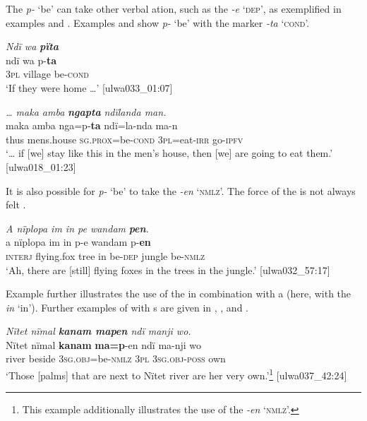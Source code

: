 The  \textit{p-} ‘be’ can take other verbal ation, such as the  \textit{-e} ‘\textsc{dep}’, as exemplified in examples  and . Examples  and  show \textit{p-} ‘be’ with the  marker \textit{-ta} ‘\textsc{cond}’.

\ea%
    \label{ex:pred:13}
          \textit{Ndï wa} \textbf{\textit{pïta}}\\
\gll    ndï  wa    p-\textbf{ta}\\
    3\textsc{pl}  village  be-\textsc{cond}\\
\glt `If they were home …’ [ulwa033\_01:07]
\z

\ea%
    \label{ex:pred:14}
          \textit{… maka amba} \textbf{\textit{ngapta}} \textit{ndïlanda man.}\\
\gll    maka  amba      nga=p-\textbf{ta}        ndï=la-nda    ma-n\\
    thus  mens.house  \textsc{sg.prox}=be-\textsc{cond}  3\textsc{pl}=eat-\textsc{irr}  go-\textsc{ipfv}\\
\glt `… if [we] stay like this in the men’s house, then [we] are going to eat them.’ [ulwa018\_01:23]
\z

It is also possible for \textit{p-} ‘be’ to take the   \textit{-en} ‘\textsc{nmlz}’. The force of the  is not always felt .

\ea%
    \label{ex:pred:15}
          \textit{A nïplopa im in pe wandam} \textbf{\textit{pen}}.\\
\gll a    nïplopa  im    in  p-e    wandam  p-\textbf{en}\\
    \textsc{interj}  flying.fox  tree  in  be-\textsc{dep}  jungle    be-\textsc{nmlz}\\
\glt `Ah, there are [still] flying foxes in the trees in the jungle.’ [ulwa032\_57:17]
\z

Example  further illustrates the use of the  in combination with a  (here, with the  \textit{in} ‘in’). Further examples of  with s are given in , , and .

\ea%
    \label{ex:pred:16}
          \textit{Nïtet nïmal \textbf{kanam mapen} ndï manji wo.}\\
\gll    Nïtet  nïmal  \textbf{kanam}    \textbf{ma=p}{}-en      ndï  ma-nji      wo\\
    [place]  river  beside    3\textsc{sg.obj}=be-\textsc{nmlz}  3\textsc{pl}  3\textsc{sg.obj-poss}  own\\
\glt `Those [palms] that are next to Nïtet river are her very own.’\footnote{This example additionally illustrates the use of the   \textit{-en} ‘\textsc{nmlz}’.} [ulwa037\_42:24]
\z

